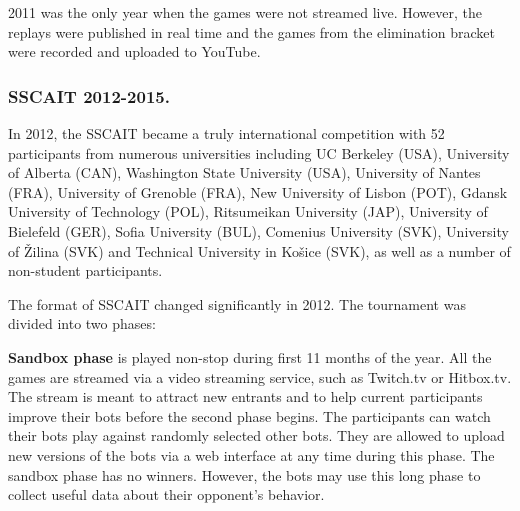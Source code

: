 \documentclass{llncs}
\begin{document}
2011 was the only year when the games were not streamed live. However, the replays were published in real time and the games from the elimination bracket were recorded and uploaded to YouTube.

\subsubsection{SSCAIT 2012-2015.}
In 2012, the SSCAIT became a truly international competition with 52 participants from numerous universities including 
UC Berkeley (USA), University of Alberta (CAN), Washington State University (USA), University of Nantes (FRA), University of Grenoble (FRA), New University of Lisbon (POT), Gdansk University of Technology (POL), Ritsumeikan University (JAP), University of Bielefeld (GER), Sofia University (BUL), Comenius University (SVK), University of \v{Z}ilina (SVK) and Technical University in Ko\v{s}ice (SVK), as well as a number of non-student participants. 

The format of SSCAIT changed significantly in 2012. The tournament was divided into two phases:

\textbf{{Sandbox phase}} is played non-stop during first 11 months of the year. All the games are streamed via a video streaming service, such as Twitch.tv or Hitbox.tv. The stream is meant to attract new entrants and to help current participants improve their bots before the second phase begins. The participants can watch their bots play against randomly selected other bots. They are allowed to upload new versions of the bots via a web interface at any time during this phase. The  sandbox phase has no winners. However, the bots may use this long phase to collect useful data about their opponent's behavior. 
\end{document}
